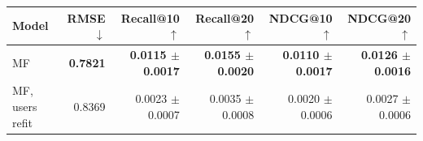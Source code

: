 \begin{tabular}{lrrrrr}
\toprule
Model & RMSE $\downarrow$ & Recall@10 $\uparrow$ & Recall@20 $\uparrow$ & NDCG@10 $\uparrow$ & NDCG@20 $\uparrow$ \\
\midrule
MF & \textbf{0.7821} & \textbf{0.0115 $\pm$ 0.0017} & \textbf{0.0155 $\pm$ 0.0020} & \textbf{0.0110 $\pm$ 0.0017} & \textbf{0.0126 $\pm$ 0.0016} \\
MF, users refit & 0.8369 & 0.0023 $\pm$ 0.0007 & 0.0035 $\pm$ 0.0008 & 0.0020 $\pm$ 0.0006 & 0.0027 $\pm$ 0.0006 \\
\bottomrule
\end{tabular}
